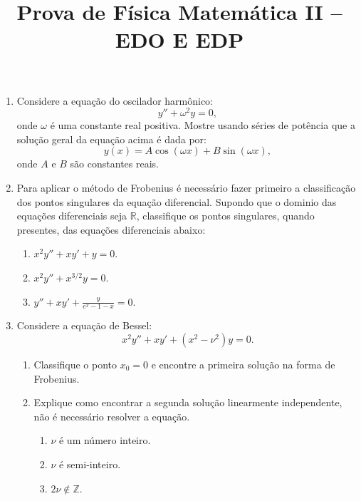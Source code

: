 \newif\ifuseseminar
\useseminartrue


\title{Prova de Física Matemática II -- EDO E EDP}


\begin{enumerate}

	\item Considere a equação do oscilador harmônico:
	      \[y'' + \omega^2 y = 0,\]
	      onde \(\omega\) é uma constante real positiva.
	      Mostre usando séries de potência que a solução geral da equação acima é dada por:
	      \[y(x) = A \cos(\omega x) + B \sin(\omega x),\]
	      onde \(A\) e \(B\) são constantes reais.

	\item Para aplicar o método de Frobenius é necessário fazer primeiro a
	      classificação dos pontos singulares da equação diferencial. Supondo que o
	      dominio das equações diferenciais seja $\mathbb{R}$, classifique os pontos
	      singulares, quando presentes, das equações diferenciais abaixo:
	      \begin{enumerate}
		      \item $x^2y'' + xy' + y = 0$.
		      \item $x^2y'' + x^{3/2}y = 0$.
		      \item $y'' + x y' + \frac{y}{e^x - 1 - x} = 0$.
	      \end{enumerate}
	\item Considere a equação de Bessel:
	      \[x^2y'' + xy' + (x^2 - \nu^2)y = 0.\]
	      \begin{enumerate}
		      \item Classifique o ponto \(x_0 = 0\) e encontre a primeira solução na forma de Frobenius.
		      \item Explique como encontrar a segunda solução linearmente independente, não
		            é necessário resolver a equação.
		            \begin{enumerate}
			            \item \(\nu\) é um número inteiro.
			            \item \(\nu\) é semi-inteiro.
			            \item \(2\nu \notin \mathbb{Z}\).
		            \end{enumerate}
	      \end{enumerate}


\end{enumerate}
